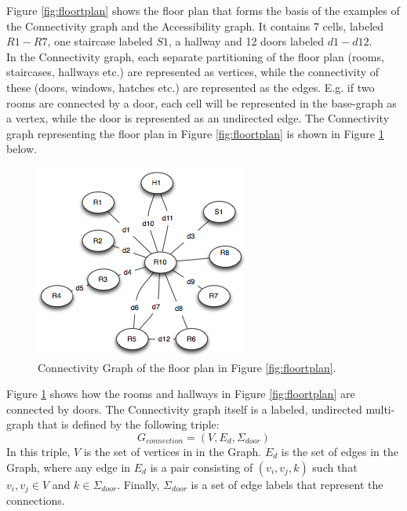 Figure \ref{fig:floortplan} shows the floor plan that forms the basis of the examples of the Connectivity graph and the Accessibility graph. 
It contains 7 cells, labeled $R1 - R7$, one staircase labeled $S1$, a hallway and 12 doors labeled $d1-d12$. \\

In the Connectivity graph, each separate partitioning of the floor plan (rooms, staircases, hallways etc.) are represented as vertices, while the connectivity of these (doors, windows, hatches etc.) are represented as the edges.
E.g. if two rooms are connected by a door, each cell will be represented in the base-graph as a vertex, while the door is represented as an undirected edge. 
The Connectivity graph representing the floor plan in Figure \ref{fig:floortplan} is shown in Figure \ref{fig:connectivitygraph} below. 

\begin{figure}[H]%
\includegraphics{images/connectivitygraph.png}%
\caption{Connectivity Graph of the floor plan in Figure \ref{fig:floortplan}.}%
\label{fig:connectivitygraph}%
\end{figure}%

Figure \ref{fig:connectivitygraph} shows how the rooms and hallways in Figure \ref{fig:floortplan} are connected by doors. 
The Connectivity graph itself is a labeled, undirected multi-graph that is defined by the following triple: \\

\begin{equation}
G_{connection} = (V, E_d, \Sigma_{door})
\end{equation}
In this triple, $V$ is the set of vertices in in the Graph. 
$E_d$ is the set of edges in the Graph, where any edge in $E_d$ is a pair consisting of $({v_i, v_j}, k)$ such that $v_i, v_j \in V$ and $k \in \Sigma_{door}$.
Finally, $\Sigma_{door}$ is a set of edge labels that represent the connections. 

